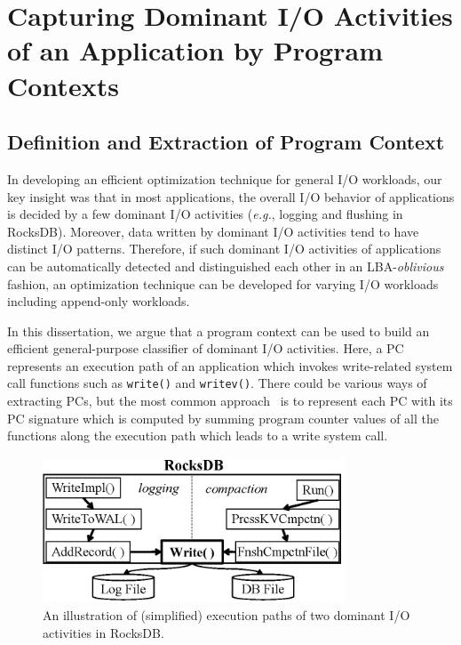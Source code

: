 \chapter{Capturing Dominant I/O Activities of an Application by Program Contexts} 
\section{Definition and Extraction of Program Context}
In developing an efficient optimization technique for general I/O workloads,
our key insight was that in most applications, the overall I/O behavior of
applications is decided by a few dominant I/O activities ({\it e.g.}, logging and
flushing in RocksDB).  Moreover, data written by dominant I/O activities tend
to have distinct I/O patterns.  Therefore, if such dominant I/O activities
of applications can be automatically detected and distinguished each other in
an LBA-{\it oblivious} fashion, an optimization technique can be
developed for varying I/O workloads including append-only workloads.

In this dissertation, we argue that a program context can be used to build an
efficient general-purpose classifier of dominant I/O activities.%
Here, a PC represents an execution path of an application
which invokes write-related system call functions such as {\tt write()} and
{\tt writev()}.  There could be various ways of extracting PCs, but the most
common approach~\cite{PC, PC2} is to represent each PC with its PC signature
which is computed by summing program counter values of all the functions along
the execution path which leads to a write system call.

\begin{figure}[t]
	\centering
	\includegraphics[width=0.8\textwidth]{figure/pcstream/writepath}
	\caption{An illustration of (simplified) execution paths of two dominant I/O activities in RocksDB.}
	\label{fig:iopath}
\end{figure}


